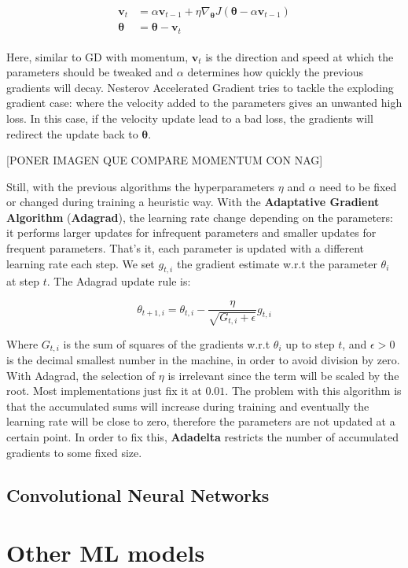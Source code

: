 \begin{align}
    \label{eqn:Nesterov_accelerated_gradient}
    \begin{split}
        \mathbf{v}_t &= \alpha \mathbf{v}_{t-1} + \eta \nabla_{\boldsymbol{\theta}} J(\boldsymbol{\theta} - \alpha \mathbf{v}_{t-1}) \\
        \boldsymbol{\theta} &= \boldsymbol{\theta} - \mathbf{v}_t
    \end{split}
\end{align}

Here, similar to GD with momentum, $\mathbf{v}_t$ is the direction and speed at which the parameters should be tweaked and $\alpha$ determines how quickly the previous gradients will decay. Nesterov Accelerated Gradient tries to tackle the exploding gradient case: where the velocity added to the parameters gives an unwanted high loss. In this case, if the velocity update lead to a bad loss, the gradients will redirect the update back to $\boldsymbol{\theta}$.

[PONER IMAGEN QUE COMPARE MOMENTUM CON NAG]

Still, with the previous algorithms the hyperparameters $\eta$ and $\alpha$ need to be fixed or changed during training a heuristic way. With the \textbf{Adaptative Gradient Algorithm} (\textbf{Adagrad}), the learning rate change depending on the parameters: it performs larger updates for infrequent parameters and smaller updates for frequent parameters. That's it, each parameter is updated with a different learning rate each step.
We set $g_{t,i}$ the gradient estimate w.r.t the parameter $\theta_i$ at step $t$. The Adagrad update rule is:

\begin{equation}
    \theta_{t+1, i} = \theta_{t,i} - \frac{\eta}{\sqrt{G_{t,i} + \epsilon}} g_{t,i}
\end{equation}

Where $G_{t,i}$ is the sum of squares of the gradients w.r.t $\theta_i$ up to step $t$, and $\epsilon > 0$ is the decimal smallest number in the machine, in order to avoid division by zero. With Adagrad, the selection of $\eta$ is irrelevant since the term will be scaled by the root. Most implementations just fix it at $0.01$. The problem with this algorithm is that the accumulated sums will increase during training and eventually the learning rate will be close to zero, therefore the parameters are not updated at a certain point.
In order to fix this, \textbf{Adadelta} restricts the number of accumulated gradients to some fixed size.

\subsection{Convolutional Neural Networks}


\section{Other ML models}
